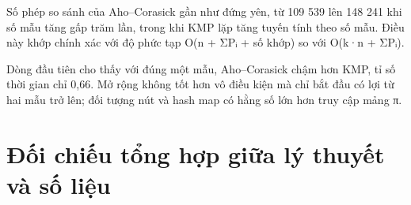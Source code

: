 Số phép so sánh của Aho--Corasick gần như đứng yên, từ 109 539 lên 148
241 khi số mẫu tăng gấp trăm lần, trong khi KMP lặp tăng tuyến tính theo
số mẫu. Điều này khớp chính xác với độ phức tạp O(n +
Σ\textbar Pᵢ\textbar{} + số khớp) so với O(k·n + Σ\textbar Pᵢ\textbar).

Dòng đầu tiên cho thấy với đúng một mẫu, Aho--Corasick chậm hơn KMP, tỉ
số thời gian chỉ 0,66. Mở rộng không tốt hơn vô điều kiện mà chỉ bắt đầu
có lợi từ hai mẫu trở lên; đối tượng nút và hash map có hằng số lớn hơn
truy cập mảng π.

\section{Đối chiếu tổng hợp giữa lý thuyết và số liệu}
\label{sec:6-9}

\begin{center}
\end{center}

